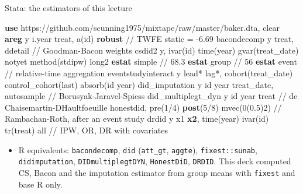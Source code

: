 \documentclass[
  11pt,
  ignorenonframetext,
  aspectratio=169,
]{beamer}
\newenvironment{Shaded}{\begin{snugshade}}{\end{snugshade}}
\newcommand{\CommentTok}[1]{\textcolor[rgb]{0.37,0.37,0.37}{#1}}
\newcommand{\FunctionTok}[1]{\textcolor[rgb]{0.28,0.35,0.67}{#1}}
\newcommand{\KeywordTok}[1]{\textcolor[rgb]{0.00,0.23,0.31}{\textbf{#1}}}
\newcommand{\NormalTok}[1]{\textcolor[rgb]{0.00,0.23,0.31}{#1}}
\newcommand{\OtherTok}[1]{\textcolor[rgb]{0.00,0.23,0.31}{#1}}
\providecommand{\tightlist}{%
  \setlength{\itemsep}{0pt}\setlength{\parskip}{0pt}}
\begin{document}
\begin{frame}[fragile]{Stata: the estimators of this lecture}
\protect{}\label{stata-the-estimators-of-this-lecture}
\begin{Shaded}
\begin{Highlighting}[]
\KeywordTok{use}\NormalTok{ https:}\CommentTok{//github.com/scunning1975/mixtape/raw/master/baker.dta, clear}
\KeywordTok{areg} \FunctionTok{y}\NormalTok{ i.}\FunctionTok{year}\NormalTok{ treat, a(id) }\KeywordTok{robust}                   \CommentTok{// TWFE static = {-}6.69}
\NormalTok{bacondecomp }\FunctionTok{y}\NormalTok{ treat, ddetail                         }\CommentTok{// Goodman{-}Bacon weights}
\NormalTok{csdid2 }\FunctionTok{y}\NormalTok{, ivar(id) time(}\FunctionTok{year}\NormalTok{) gvar(treat\_date) notyet method(stdipw) long2}
\KeywordTok{estat}\NormalTok{ simple                                         }\CommentTok{// 68.3}
\KeywordTok{estat} \FunctionTok{group}                                          \CommentTok{// 56}
\KeywordTok{estat}\NormalTok{ event                                          }\CommentTok{// relative{-}time aggregation}
\NormalTok{eventstudyinteract }\FunctionTok{y}\NormalTok{ lead* lag*, cohort(treat\_date) control\_cohort(}\FunctionTok{last}\NormalTok{) absorb(id }\FunctionTok{year}\NormalTok{)}
\NormalTok{did\_imputation }\FunctionTok{y}\NormalTok{ id }\FunctionTok{year}\NormalTok{ treat\_date, autosample      }\CommentTok{// Borusyak{-}Jaravel{-}Spiess}
\NormalTok{did\_multiplegt\_dyn }\FunctionTok{y}\NormalTok{ id }\FunctionTok{year}\NormalTok{ treat                   }\CommentTok{// de Chaisemartin{-}D\textquotesingle{}Haultfoeuille}
\NormalTok{honestdid, pre(1/4) }\KeywordTok{post}\NormalTok{(5/8) mvec(0(0.5)2)          }\CommentTok{// Rambachan{-}Roth, after an event study}
\NormalTok{drdid }\FunctionTok{y}\NormalTok{ x1 }\KeywordTok{x2}\NormalTok{, time(}\FunctionTok{year}\NormalTok{) ivar(id) tr(treat) }\OtherTok{all}     \CommentTok{// IPW, OR, DR with covariates}
\end{Highlighting}
\end{Shaded}

\begin{itemize}
\tightlist
\item
  R equivalents: \texttt{bacondecomp}, \texttt{did} (\texttt{att\_gt},
  \texttt{aggte}), \texttt{fixest::sunab}, \texttt{didimputation},
  \texttt{DIDmultiplegtDYN}, \texttt{HonestDiD}, \texttt{DRDID}. This
  deck computed CS, Bacon and the imputation estimator from group means
  with \texttt{fixest} and base R only.
\end{itemize}
\end{frame}
\end{document}

